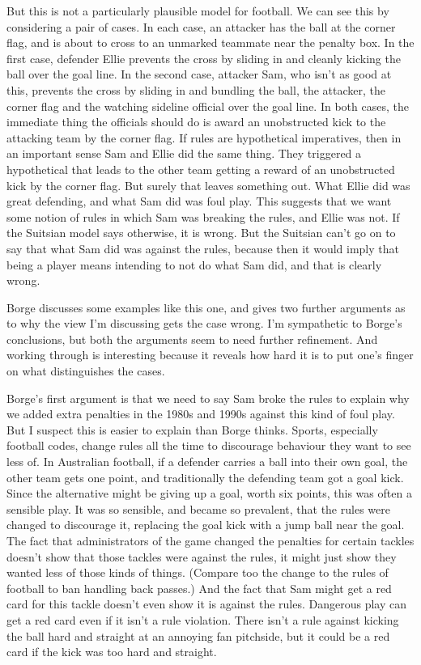 \documentclass[
  11pt,
  letterpaper,
  DIV=11,
  numbers=noendperiod,
  oneside]{scrartcl}
\begin{document}
But this is not a particularly plausible model for football. We can see
this by considering a pair of cases. In each case, an attacker has the
ball at the corner flag, and is about to cross to an unmarked teammate
near the penalty box. In the first case, defender Ellie prevents the
cross by sliding in and cleanly kicking the ball over the goal line. In
the second case, attacker Sam, who isn't as good at this, prevents the
cross by sliding in and bundling the ball, the attacker, the corner flag
and the watching sideline official over the goal line. In both cases,
the immediate thing the officials should do is award an unobstructed
kick to the attacking team by the corner flag. If rules are hypothetical
imperatives, then in an important sense Sam and Ellie did the same
thing. They triggered a hypothetical that leads to the other team
getting a reward of an unobstructed kick by the corner flag. But surely
that leaves something out. What Ellie did was great defending, and what
Sam did was foul play. This suggests that we want some notion of rules
in which Sam was breaking the rules, and Ellie was not. If the Suitsian
model says otherwise, it is wrong. But the Suitsian can't go on to say
that what Sam did was against the rules, because then it would imply
that being a player means intending to not do what Sam did, and that is
clearly wrong.

Borge discusses some examples like this one, and gives two further
arguments as to why the view I'm discussing gets the case wrong. I'm
sympathetic to Borge's conclusions, but both the arguments seem to need
further refinement. And working through is interesting because it
reveals how hard it is to put one's finger on what distinguishes the
cases.

Borge's first argument is that we need to say Sam broke the rules to explain
why we added extra penalties in the 1980s and 1990s against this kind of
foul play. But I suspect this is easier to explain than Borge thinks.
Sports, especially football codes, change rules all the time to
discourage behaviour they want to see less of. In Australian football,
if a defender carries a ball into their own goal, the other team gets
one point, and traditionally the defending team got a goal kick. Since
the alternative might be giving up a goal, worth six points, this was
often a sensible play. It was so sensible, and became so prevalent, that
the rules were changed to discourage it, replacing the goal kick with a
jump ball near the goal. The fact that administrators of the game
changed the penalties for certain tackles doesn't show that those
tackles were against the rules, it might just show they wanted less of
those kinds of things. (Compare too the change to the rules of football
to ban handling back passes.) And the fact that Sam might get a red card
for this tackle doesn't even show it is against the rules. Dangerous
play can get a red card even if it isn't a rule violation. There isn't a
rule against kicking the ball hard and straight at an annoying fan
pitchside, but it could be a red card if the kick was too hard and
straight.
\end{document}
